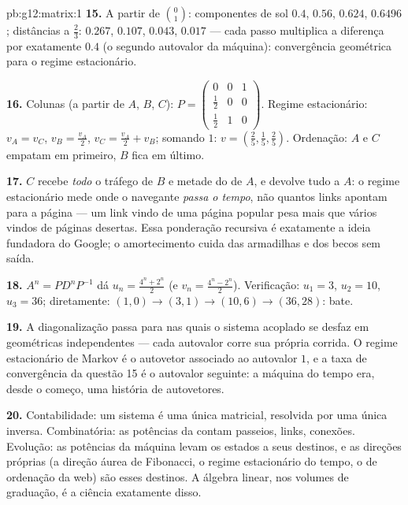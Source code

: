 \begin{solution}{pb:g12:matrix:1}
\textbf{15.} A partir de $\binom01$: componentes de sol $0.4$,
$0.56$, $0.624$, $0.6496$; distâncias a $\frac23$: $0.267$,
$0.107$, $0.043$, $0.017$ --- cada passo multiplica a
diferença por exatamente $0.4$ (o segundo autovalor da
máquina): convergência geométrica para o regime estacionário.

\textbf{16.} Colunas (a partir de $A$, $B$, $C$):
$P = \begin{pmatrix} 0 & 0 & 1\\ \frac12 & 0 & 0\\
\frac12 & 1 & 0\end{pmatrix}$. Regime estacionário:
$v_A = v_C$, $v_B = \frac{v_A}{2}$,
$v_C = \frac{v_A}{2} + v_B$; somando $1$:
$v = \left(\frac25, \frac15, \frac25\right)$. Ordenação: $A$ e
$C$ empatam em primeiro, $B$ fica em último.

\textbf{17.} $C$ recebe \emph{todo} o tráfego de $B$ e metade
do de $A$, e devolve tudo a $A$: o regime estacionário mede
onde o navegante \emph{passa o tempo}, não quantos links
apontam para a página --- um link vindo de uma página popular
pesa mais que vários vindos de páginas desertas. Essa
ponderação recursiva é exatamente a ideia fundadora do Google;
o amortecimento cuida das armadilhas e dos becos sem saída.

\textbf{18.} $A^n = P D^n P^{-1}$ dá
$u_n = \frac{4^n + 2^n}{2}$ (e
$v_n = \frac{4^n - 2^n}{2}$). Verificação: $u_1 = 3$,
$u_2 = 10$, $u_3 = 36$; diretamente:
$(1,0) \to (3,1) \to (10,6) \to (36, 28)$: bate.

\textbf{19.} A diagonalização passa para  nas quais
o sistema acoplado se desfaz em  geométricas
independentes --- cada autovalor corre sua própria corrida. O
regime estacionário de Markov é o autovetor associado ao
autovalor $1$, e a taxa de convergência da questão 15 é o
autovalor seguinte: a máquina do tempo era, desde o começo,
uma história de autovetores.

\textbf{20.} Contabilidade: um sistema é uma única 
matricial, resolvida por uma única inversa. Combinatória: as
potências da  contam passeios, links,
conexões. Evolução: as potências da máquina levam os estados
a seus destinos, e as direções próprias (a direção áurea de
Fibonacci, o regime estacionário do tempo, o  de
ordenação da web) são esses destinos. A álgebra linear, nos
volumes de graduação, é a ciência exatamente disso.
\end{solution}
